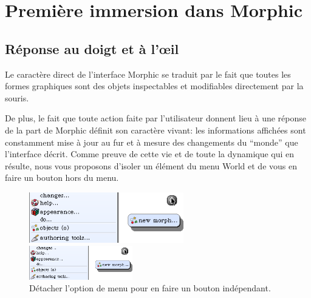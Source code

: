 \documentclass[a4paper,10pt,twoside]{book}
\begin{document}
\section{Premi\`ere immersion dans Morphic}

\subsection{R\'eponse au doigt et \`a l'\oe il}
Le caract\`ere direct de l'interface Morphic se traduit par le fait
que toutes les formes graphiques sont des objets 
inspectables et modifiables directement par la souris.

De plus, le fait que toute action faite par l'utilisateur donnent lieu
\`a une r\'eponse de la part de Morphic d\'efinit son caract\`ere
vivant: les informations affich\'ees sont constamment mise \`a jour
au fur et \`a mesure des changements du ``monde'' que l'interface
d\'ecrit. 
Comme preuve de cette vie et de toute la dynamique qui en r\'esulte,
nous vous proposons d'isoler un \'el\'ement du menu World et de vous
en faire un bouton hors du menu.


\begin{figure}[ht]
	\ifluluelse
		{\centerline{\includegraphics[width=0.6\textwidth]{detachingMenu}}}
		{\centerline{\includegraphics[width=0.4\textwidth]{detachingMenu}}}
	\caption{D\'etacher l'option de menu  pour
      en faire un bouton ind\'ependant.\label{fig:detachingMenu}}
\end{figure}
\end{document}
